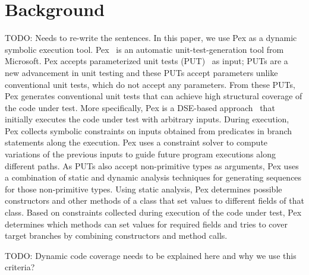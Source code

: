 \section{Background}
\label{sec:background}

TODO: Needs to re-write the sentences.
In this paper, we use Pex as a dynamic symbolic execution tool. Pex~\cite{tillman:pexwhite} 
is an automatic unit-test-generation tool from Microsoft. Pex accepts 
parameterized unit tests (PUT)~\cite{tillmann05:parameterized} as input; 
PUTs are a new advancement in unit testing and these PUTs accept parameters 
unlike conventional unit tests, which do not accept any parameters. 
From these PUTs, Pex generates conventional unit tests that can achieve high 
structural coverage of the code under test. More specifically, Pex is a 
DSE-based approach~\cite{godefroid:dart} that initially executes the code 
under test with arbitrary inputs. During execution, Pex collects symbolic 
constraints on inputs obtained from predicates in branch statements along 
the execution. Pex uses a constraint solver to compute variations of the 
previous inputs to guide future program executions along different paths. 
As PUTs also accept non-primitive types as arguments, Pex uses a combination 
of static and dynamic analysis techniques for generating sequences 
for those non-primitive types. Using static analysis, Pex determines 
possible constructors and other methods of a class that set values 
to different fields of that class. Based on constraints collected 
during execution of the code under test, Pex determines which 
methods can set values for required fields and tries to cover target 
branches by combining constructors and method calls.

TODO: Dynamic code coverage needs to be explained here and why we
use this criteria?